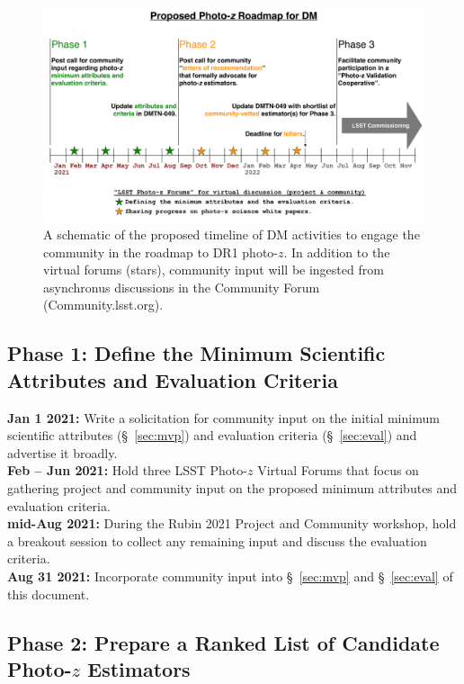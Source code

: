 \documentclass[DM,lsstdraft,toc]{lsstdoc}
\begin{document}
\begin{figure}
\begin{center}
\includegraphics[width=17cm,trim=0cm 6cm 0cm 4cm, clip]{DMTN049_timeline.pdf}
\caption{A schematic of the proposed timeline of DM activities to engage the community in the roadmap to DR1 photo-$z$. In addition to the virtual forums (stars), community input will be ingested from asynchronus discussions in the Community Forum (Community.lsst.org). \label{fig:timeline}}
\end{center}
\end{figure}

\subsection{Phase 1: Define the Minimum Scientific Attributes and Evaluation Criteria}\label{ssec:time_mvp}

{\bf Jan 1 2021:} Write a solicitation for community input on the initial minimum scientific attributes (\S~\ref{sec:mvp}) and evaluation criteria (\S~\ref{sec:eval}) and advertise it broadly. \\
{\bf Feb -- Jun 2021:} Hold three LSST Photo-$z$ Virtual Forums that focus on gathering project and community input on the proposed minimum attributes and evaluation criteria. \\
{\bf mid-Aug 2021:} During the Rubin 2021 Project and Community workshop, hold a breakout session to collect any remaining input and discuss the evaluation criteria. \\
{\bf Aug 31 2021:} Incorporate community input into \S~\ref{sec:mvp} and \S~\ref{sec:eval} of this document.

\subsection{Phase 2: Prepare a Ranked List of Candidate Photo-$z$ Estimators}\label{ssec:time_wp}
\end{document}

